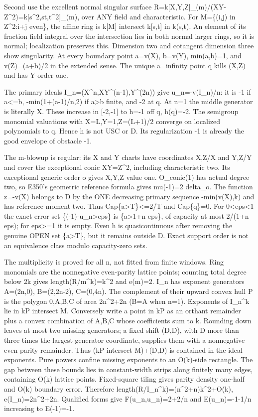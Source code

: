 \documentclass[11pt]{article}
\begin{document}
Second use the excellent normal singular surface R=k[X,Y,Z]\_(m)/(XY-Z\textasciicircum{}2)=k[s\textasciicircum{}2,st,t\textasciicircum{}2]\_(m), over ANY field and characteristic. For M=\{(i,j) in Z\textasciicircum{}2:i+j even\}, the affine ring is k[M] intersect k[s,t] in k(s,t). An element of its fraction field integral over the intersection lies in both normal larger rings, so it is normal; localization preserves this. Dimension two and cotangent dimension three show singularity. At every boundary point a=v(X), b=v(Y), min(a,b)=1, and v(Z)=(a+b)/2 in the extended sense. The unique a=infinity point q kills (X,Z) and has Y-order one.

The primary ideals I\_n=(X\textasciicircum{}n,XY\textasciicircum{}(n-1),Y\textasciicircum{}(2n)) give u\_n=-v(I\_n)/n: it is -1 if a<=b, -min(1+(a-1)/n,2) if a>b finite, and -2 at q. At n=1 the middle generator is literally X. These increase in [-2,-1] to h=-1 off q, h(q)=-2. The semigroup monomial valuations with X=L,Y=1,Z=(L+1)/2 converge on localized polynomials to q. Hence h is not USC or D. Its regularization -1 is already the good envelope of obstacle -1.

The m-blowup is regular: its X and Y charts have coordinates X,Z/X and Y,Z/Y and cover the exceptional conic XY=Z\textasciicircum{}2, including characteristic two. Its exceptional generic order o gives X,Y,Z value one. O\_conic(1) has actual degree two, so E350's geometric reference formula gives mu(-1)=2 delta\_o. The function z=-v(X) belongs to D by the ONE decreasing primary sequence -min(v(X),k) and has reference moment two. Thus Cap\{a>T\}<=2/T and Cap\{q\}=0. For 0<eps<1 the exact error set \{(-1)-u\_n>eps\} is \{a>1+n eps\}, of capacity at most 2/(1+n eps); for eps>=1 it is empty. Even h is quasicontinuous after removing the genuine OPEN set \{a>T\}, but it remains outside D. Exact support order is not an equivalence class modulo capacity-zero sets.

The multiplicity is proved for all n, not fitted from finite windows. Ring monomials are the nonnegative even-parity lattice points; counting total degree below 2k gives length(R/m\textasciicircum{}k)=k\textasciicircum{}2 and e(m)=2. I\_n has exponent generators A=(2n,0), B=(2,2n-2), C=(0,4n). The complement of their upward convex hull P is the polygon 0,A,B,C of area 2n\textasciicircum{}2+2n (B=A when n=1). Exponents of I\_n\textasciicircum{}k lie in kP intersect M. Conversely write a point in kP as an orthant remainder plus a convex combination of A,B,C whose coefficients sum to k. Rounding down leaves at most two missing generators; a fixed shift (D,D), with D more than three times the largest generator coordinate, supplies them with a nonnegative even-parity remainder. Thus (kP intersect M)+(D,D) is contained in the ideal exponents. Pure powers confine missing exponents to an O(k)-side rectangle. The gap between these bounds lies in constant-width strips along finitely many edges, containing O(k) lattice points. Fixed-square tiling gives parity density one-half and O(k) boundary error. Therefore length(R/I\_n\textasciicircum{}k)=(n\textasciicircum{}2+n)k\textasciicircum{}2+O(k), e(I\_n)=2n\textasciicircum{}2+2n. Qualified forms give F(u\_n,u\_n)=2+2/n and E(u\_n)=-1-1/n increasing to E(-1)=-1.
\end{document}
